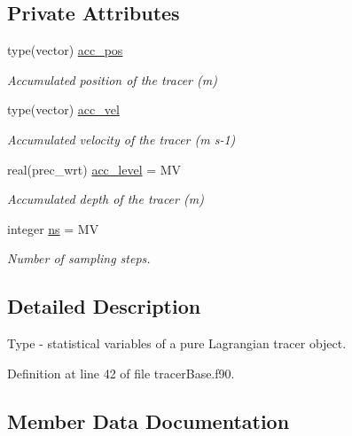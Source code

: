 \subsection*{Private Attributes}
\begin{DoxyCompactItemize}
\item 
type(vector) \mbox{\hyperlink{structtracerbase__mod_1_1tracer__stats__class_ab873af2b6de9650bd8db0c4ebbf8bcbe}{acc\+\_\+pos}}
\begin{DoxyCompactList}\small\item\em Accumulated position of the tracer (m) \end{DoxyCompactList}\item 
type(vector) \mbox{\hyperlink{structtracerbase__mod_1_1tracer__stats__class_aaac47a74e7741ce3b8e300f38f1abb0e}{acc\+\_\+vel}}
\begin{DoxyCompactList}\small\item\em Accumulated velocity of the tracer (m s-\/1) \end{DoxyCompactList}\item 
real(prec\+\_\+wrt) \mbox{\hyperlink{structtracerbase__mod_1_1tracer__stats__class_ad97a8b58596f4c36ed7af64b7e445a5f}{acc\+\_\+level}} = MV
\begin{DoxyCompactList}\small\item\em Accumulated depth of the tracer (m) \end{DoxyCompactList}\item 
integer \mbox{\hyperlink{structtracerbase__mod_1_1tracer__stats__class_ad0fd94fb56ff9eaf4766fabc2e83b3a7}{ns}} = MV
\begin{DoxyCompactList}\small\item\em Number of sampling steps. \end{DoxyCompactList}\end{DoxyCompactItemize}


\subsection{Detailed Description}
Type -\/ statistical variables of a pure Lagrangian tracer object. 

Definition at line 42 of file tracer\+Base.\+f90.



\subsection{Member Data Documentation}
\mbox{\label{structtracerbase__mod_1_1tracer__stats__class_ad97a8b58596f4c36ed7af64b7e445a5f}} 
